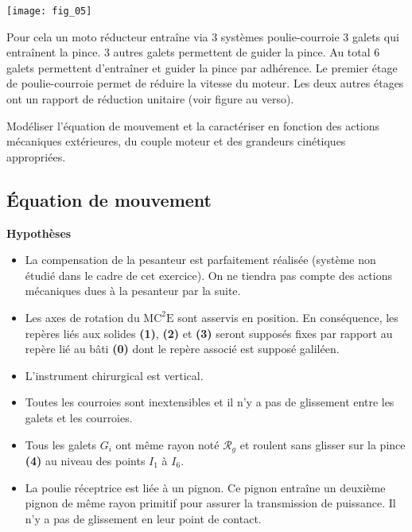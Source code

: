 \begin{center}
\texttt{[image: fig\_05]}
\end{center}

Pour cela un moto réducteur entraîne via 3 systèmes poulie-courroie 3 galets qui entraînent la pince. 3 autres galets permettent de guider la pince. Au total 6 galets permettent d'entraîner et guider la pince par adhérence. Le premier étage de poulie-courroie permet de réduire la vitesse du moteur. Les deux autres étages ont un rapport de réduction unitaire (voir figure au verso). 
\fi



\begin{obj}
Modéliser l’équation de mouvement et la caractériser en fonction des actions mécaniques extérieures, du couple moteur et des grandeurs cinétiques appropriées.
\end{obj}




\subsection*{Équation de mouvement}


\ifprof
\else
\textbf{Hypothèses}
\begin{itemize}
\item La compensation de la pesanteur est parfaitement réalisée (système non étudié dans le cadre de cet exercice). On ne tiendra pas compte des actions mécaniques dues à la pesanteur par la suite.
\item Les axes de rotation du $\text{MC}^2\text{E}$ sont asservis en position. En conséquence, les repères liés aux solides \textbf{(1)}, \textbf{(2)} et \textbf{(3)} seront supposés fixes par rapport au repère lié au bâti \textbf{(0)} dont le repère associé est supposé galiléen.
\item L’instrument chirurgical est vertical.
\item Toutes les courroies sont inextensibles et il n’y a pas de glissement entre les galets et les courroies.
\item Tous les galets $G_i$ ont même rayon noté $\mathcal{R}_g$ et roulent sans glisser sur la pince \textbf{(4)} au niveau des points $I_1$ à $I_6$.
\item La poulie réceptrice est liée à un pignon. Ce pignon entraîne un deuxième pignon de même rayon primitif pour assurer la transmission de puissance. Il n’y a pas de glissement en leur point de contact.
\end{itemize}

